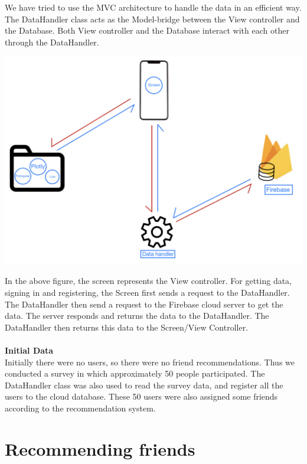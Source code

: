 \documentclass[11pt]{report}
\begin{document}
We have tried to use the MVC architecture to handle the data in an efficient  way. The DataHandler class acts as the Model-bridge between the View controller and the Database. Both View controller and the Database interact with each other through the DataHandler.

\begin{center}
     \includegraphics[scale = .28]{Images/handling.jpeg}
\end{center}

In the above figure, the screen represents the View controller. For getting data, signing in and registering, the Screen first sends a request to the DataHandler. \\

The DataHandler then send a request to the Firebase cloud server to get the data. The server responds and returns the data to the DataHandler. The DataHandler then returns this data to the Screen/View Controller. \\\\

{\bf Initial Data} ~\\

Initially there were no users, so there were no friend recommendations. Thus we conducted a survey in which approximately 50 people participated. The DataHandler class was also used to read the survey data, and register all the users to the cloud database. These 50 users were also assigned some friends according to the recommendation system.




\section{Recommending friends}
\end{document}
